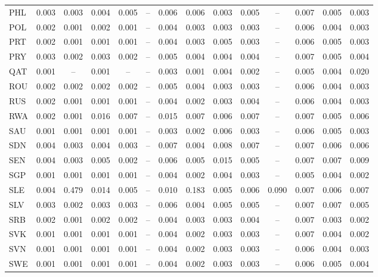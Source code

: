 \begin{longtable}{l*{13}{c}}
PHL & 0.003 & 0.003 & 0.004 & 0.005 & -- & 0.006 & 0.006 & 0.003 & 0.005 & -- & 0.007 & 0.005 & 0.003 \\
POL & 0.002 & 0.001 & 0.002 & 0.001 & -- & 0.004 & 0.003 & 0.003 & 0.003 & -- & 0.006 & 0.004 & 0.003 \\
PRT & 0.002 & 0.001 & 0.001 & 0.001 & -- & 0.004 & 0.003 & 0.005 & 0.003 & -- & 0.006 & 0.005 & 0.003 \\
PRY & 0.003 & 0.002 & 0.003 & 0.002 & -- & 0.005 & 0.004 & 0.004 & 0.004 & -- & 0.007 & 0.005 & 0.004 \\
QAT & 0.001 & -- & 0.001 & -- & -- & 0.003 & 0.001 & 0.004 & 0.002 & -- & 0.005 & 0.004 & 0.020 \\
ROU & 0.002 & 0.002 & 0.002 & 0.002 & -- & 0.005 & 0.004 & 0.003 & 0.003 & -- & 0.006 & 0.004 & 0.003 \\
RUS & 0.002 & 0.001 & 0.001 & 0.001 & -- & 0.004 & 0.002 & 0.003 & 0.004 & -- & 0.006 & 0.004 & 0.003 \\
RWA & 0.002 & 0.001 & 0.016 & 0.007 & -- & 0.015 & 0.007 & 0.006 & 0.007 & -- & 0.007 & 0.005 & 0.006 \\
SAU & 0.001 & 0.001 & 0.001 & 0.001 & -- & 0.003 & 0.002 & 0.006 & 0.003 & -- & 0.006 & 0.005 & 0.003 \\
SDN & 0.004 & 0.003 & 0.004 & 0.003 & -- & 0.007 & 0.004 & 0.008 & 0.007 & -- & 0.007 & 0.006 & 0.006 \\
SEN & 0.004 & 0.003 & 0.005 & 0.002 & -- & 0.006 & 0.005 & 0.015 & 0.005 & -- & 0.007 & 0.007 & 0.009 \\
SGP & 0.001 & 0.001 & 0.001 & 0.001 & -- & 0.004 & 0.002 & 0.004 & 0.003 & -- & 0.005 & 0.004 & 0.002 \\
SLE & 0.004 & 0.479 & 0.014 & 0.005 & -- & 0.010 & 0.183 & 0.005 & 0.006 & 0.090 & 0.007 & 0.006 & 0.007 \\
SLV & 0.003 & 0.002 & 0.003 & 0.003 & -- & 0.006 & 0.004 & 0.005 & 0.005 & -- & 0.007 & 0.007 & 0.005 \\
SRB & 0.002 & 0.001 & 0.002 & 0.002 & -- & 0.004 & 0.003 & 0.003 & 0.004 & -- & 0.007 & 0.003 & 0.002 \\
SVK & 0.001 & 0.001 & 0.001 & 0.001 & -- & 0.004 & 0.002 & 0.003 & 0.003 & -- & 0.007 & 0.004 & 0.002 \\
SVN & 0.001 & 0.001 & 0.001 & 0.001 & -- & 0.004 & 0.002 & 0.003 & 0.003 & -- & 0.006 & 0.004 & 0.003 \\
SWE & 0.001 & 0.001 & 0.001 & 0.001 & -- & 0.004 & 0.002 & 0.003 & 0.003 & -- & 0.006 & 0.005 & 0.004 \\

\end{longtable}

